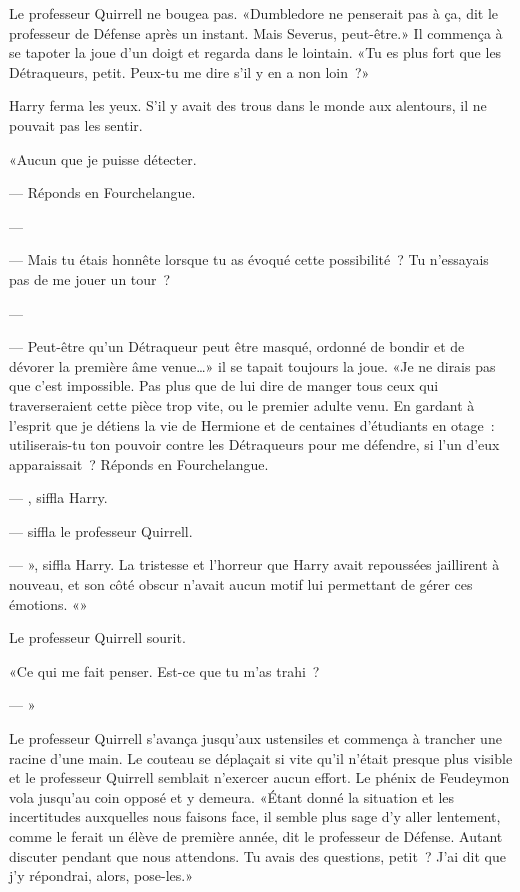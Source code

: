 Le professeur Quirrell ne bougea pas. «Dumbledore ne penserait pas à ça, dit le professeur de Défense après un instant. Mais Severus, peut-être.» Il commença à se tapoter la joue d'un doigt et regarda dans le lointain. «Tu es plus fort que les Détraqueurs, petit. Peux-tu me dire s'il y en a non loin~?»

Harry ferma les yeux. S'il y avait des trous dans le monde aux alentours, il ne pouvait pas les sentir.

«Aucun que je puisse détecter.

--- Réponds en Fourchelangue.

--- 

--- Mais tu étais honnête lorsque tu as évoqué cette possibilité~? Tu n'essayais pas de me jouer un tour~?

--- 

--- Peut-être qu'un Détraqueur peut être masqué, ordonné de bondir et de dévorer la première âme venue…» il se tapait toujours la joue. «Je ne dirais pas que c'est impossible. Pas plus que de lui dire de manger tous ceux qui traverseraient cette pièce trop vite, ou le premier adulte venu. En gardant à l'esprit que je détiens la vie de Hermione et de centaines d'étudiants en otage~: utiliserais-tu ton pouvoir contre les Détraqueurs pour me défendre, si l'un d'eux apparaissait~? Réponds en Fourchelangue.

--- , siffla Harry.

---  siffla le professeur Quirrell. 

--- », siffla Harry. La tristesse et l'horreur que Harry avait repoussées jaillirent à nouveau, et son côté obscur n'avait aucun motif lui permettant de gérer ces émotions. «»

Le professeur Quirrell sourit.

«Ce qui me fait penser. Est-ce que tu m'as trahi~?

--- »

Le professeur Quirrell s'avança jusqu'aux ustensiles et commença à trancher une racine d'une main. Le couteau se déplaçait si vite qu'il n'était presque plus visible et le professeur Quirrell semblait n'exercer aucun effort. Le phénix de Feudeymon vola jusqu'au coin opposé et y demeura. «Étant donné la situation et les incertitudes auxquelles nous faisons face, il semble plus sage d'y aller lentement, comme le ferait un élève de première année, dit le professeur de Défense. Autant discuter pendant que nous attendons. Tu avais des questions, petit~? J'ai dit que j'y répondrai, alors, pose-les.»
